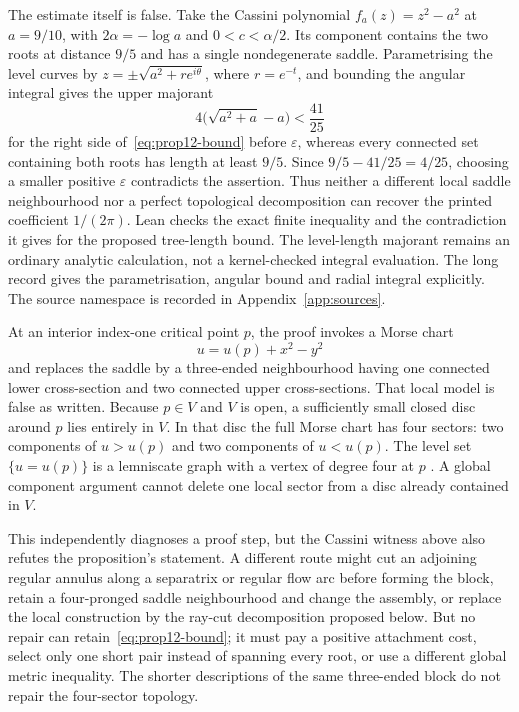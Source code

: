 \documentclass[11pt]{article}
\begin{document}
The estimate itself is false.  Take the Cassini polynomial
$f_a(z)=z^2-a^2$ at $a=9/10$, with $2\alpha=-\log a$ and
$0<c<\alpha/2$. Its component contains the two roots at distance $9/5$
and has a single nondegenerate saddle. Parametrising the level curves
by $z=\pm\sqrt{a^2+re^{i\theta}}$, where $r=e^{-t}$, and bounding
the angular integral gives the upper majorant
\[
  4\bigl(\sqrt{a^2+a}-a\bigr)<\frac{41}{25}
\]
for the right side of~\eqref{eq:prop12-bound} before $\varepsilon$, whereas
every connected set containing both roots has length at least $9/5$.  Since
$9/5-41/25=4/25$, choosing a smaller positive $\varepsilon$ contradicts the
assertion.  Thus neither a different local saddle neighbourhood nor a perfect
topological decomposition can recover the printed coefficient $1/(2\pi)$.
Lean checks the exact finite inequality and the contradiction it gives
for the proposed tree-length bound. The level-length majorant remains
an ordinary analytic calculation, not a kernel-checked integral evaluation.
The long record gives the parametrisation, angular bound and radial
integral explicitly. The source namespace is recorded in
Appendix~\ref{app:sources}.

At an interior index-one critical point $p$, the proof invokes a Morse chart
\[
 u=u(p)+x^2-y^2
\]
and replaces the saddle by a three-ended neighbourhood having one connected
lower cross-section and two connected upper cross-sections.  That local model
is false as written.  Because $p\in V$ and $V$ is open, a sufficiently small
closed disc around $p$ lies entirely in $V$.  In that disc the full Morse chart
has four sectors: two components of $u>u(p)$ and two components of $u<u(p)$.
The level set $\{u=u(p)\}$ is a lemniscate graph with a vertex of degree four
at $p$ \cite[Definition~1.2 and Proposition~2.4]{bishop-eremenko-lazebnik}.
A global component argument cannot delete one local sector from a disc already
contained in $V$.

This independently diagnoses a proof step, but the Cassini witness above also
refutes the proposition's statement.  A different route might
cut an adjoining regular annulus along a separatrix or regular flow arc before
forming the block, retain a four-pronged saddle neighbourhood and change the
assembly, or replace the local construction by the ray-cut decomposition
proposed below.  But no repair can retain~\eqref{eq:prop12-bound}; it must pay a
positive attachment cost, select only one short pair instead of spanning every
root, or use a different global metric inequality.
The shorter descriptions of the same three-ended block do not repair the
four-sector topology.
\end{document}

